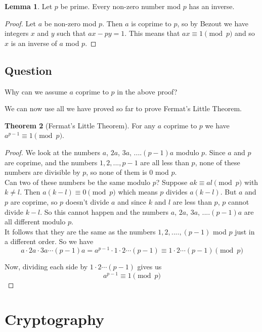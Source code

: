 \documentclass[12pt]{amsart}
\theoremstyle{definition}
\newtheorem{theorem}{Theorem}
\newtheorem{lemma}[theorem]{Lemma}
\theoremstyle{definition}
\theoremstyle{remark}
\begin{document}
\begin{lemma}
Let $p$ be prime. Every non-zero number mod $p$ has an inverse.
\end{lemma}
\begin{proof}
Let $a$ be non-zero mod $p$. Then $a$ is coprime to $p$, so by Bezout we have integers $x$ and $y$ such that $ax -py=1$. This means that $ax \equiv 1 \pmod p$ and so $x$ is an inverse of $a$ mod $p$.
\end{proof}

\subsection*{Question}
Why can we assume $a$ coprime to $p$ in the above proof?

\vspace{10pt}

We can now use all we have proved so far to prove Fermat's Little Theorem.

\begin{theorem}[Fermat's Little Theorem]
For any $a$ coprime to $p$ we have $a^{p-1} \equiv 1 \pmod p$.
\end{theorem}

\begin{proof}
We look at the numbers $a$, $2a$, $3a$, ....$(p-1)a$ modulo $p$. Since $a$ and $p$ are coprime, and the numbers $1, 2, ... , p-1$ are all less than $p$, none of these numbers are divisible by $p$, so none of them is 0 mod $p$.\\
Can two of these numbers be the same modulo $p$? Suppose $ak \equiv al\pmod p$ with $k \neq l$. Then $a(k-l)\equiv 0 \pmod p$ which means $p$ divides $a(k-l)$. But $a$ and $p$ are coprime, so $p$ doesn't divide $a$ and since $k$ and $l$ are less than $p$, $p$ cannot divide $k-l$. So this cannot happen and the numbers $a$, $2a$, $3a$, ....$(p-1)a$ are all different modulo $p$.\\
It follows that they are the same as the numbers $1, 2, ...., (p-1)$ mod $p$ just in a different order. 
So we have
\[
a\cdot 2a \cdot 3a \cdots (p-1)a = a^{p-1}\cdot 1\cdot 2 \cdots (p-1) \equiv 1 \cdot 2 \cdots (p-1) \pmod p
\]

Now, dividing each side by $1 \cdot 2 \cdots (p-1)$ gives us 
\[
a^{p-1} \equiv 1 \pmod p
\]
\end{proof}

\section{Cryptography}
\end{document}
